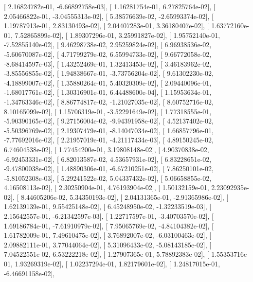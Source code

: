 \documentclass{article}
\begin{document}
       [  2.16824782e-01,  -6.66892758e-03],
       [  1.16281754e-01,   6.27825764e-02],
       [  2.05466822e-01,  -3.04555313e-02],
       [  5.38576639e-02,  -2.65993374e-02],
       [  1.19787913e-01,   2.83130493e-02],
       [  2.04407283e-01,   3.36180407e-02],
       [  1.63772160e-01,   7.52865899e-02],
       [  1.89307296e-01,   3.25991827e-02],
       [  1.95752140e-01,  -7.52855140e-02],
       [  9.46298738e-02,   2.95259824e-02],
       [  6.96938536e-02,  -5.60670087e-02],
       [  4.71799279e-02,   6.55994733e-02],
       [  9.66772058e-02,  -8.68414597e-03],
       [  1.43252469e-01,   1.32413453e-02],
       [  3.46183962e-02,  -3.85556855e-02],
       [  1.94838667e-01,  -3.73756204e-02],
       [  9.61302230e-02,  -4.18899007e-02],
       [  1.35880264e-01,   5.40320309e-02],
       [  2.09440096e-01,  -1.68017761e-02],
       [  1.30316901e-01,   6.44488600e-04],
       [  1.15953634e-01,  -1.34763346e-02],
       [  8.86774817e-02,  -1.21027035e-02],
       [  8.60752716e-02,   8.10165099e-02],
       [  1.15706319e-01,  -3.52291649e-02],
       [  1.77318555e-01,  -5.90390165e-02],
       [  9.27156004e-02,  -9.94391958e-02],
       [  4.52137402e-02,  -5.50396769e-02],
       [  2.19307479e-01,  -8.14047034e-02],
       [  1.66857796e-01,  -7.77692016e-02],
       [  2.21957019e-01,  -4.21117434e-03],
       [  4.89150245e-02,   6.74604538e-02],
       [  1.77454200e-01,   3.19808148e-02],
       [  4.90370838e-02,  -6.92453331e-02],
       [  6.82013587e-02,   4.53657931e-02],
       [  6.83228651e-02,  -9.47800038e-02],
       [  1.48890306e-01,  -6.67210251e-02],
       [  7.86250101e-02,  -5.81052308e-03],
       [  5.29241522e-02,   5.04337432e-02],
       [  5.06658855e-02,   4.16508113e-02],
       [  2.30250904e-01,   4.76193904e-02],
       [  1.50132159e-01,   2.23092935e-02],
       [  8.44605206e-02,   5.34350193e-02],
       [  2.04131365e-01,  -2.91365986e-02],
       [  1.62139139e-01,   9.55425148e-02],
       [  6.45248950e-02,  -1.32233519e-03],
       [  2.15642557e-01,  -6.21342597e-03],
       [  1.22717597e-01,  -3.40703570e-02],
       [  1.69186784e-01,  -7.61910979e-02],
       [  7.95065769e-02,  -4.84104382e-02],
       [  1.61782009e-01,   7.49610475e-02],
       [  3.76892007e-02,  -6.03100463e-02],
       [  2.09882111e-01,   3.77044064e-02],
       [  5.31096433e-02,  -5.08143185e-02],
       [  7.04522551e-02,   6.53222218e-02],
       [  1.27907365e-01,   5.78892383e-02],
       [  1.55353716e-01,   1.93269319e-02],
       [  1.02237294e-01,   1.82179601e-02],
       [  1.24817015e-01,  -6.46691158e-02],
\end{document}
